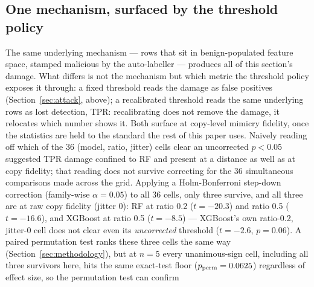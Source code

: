 \subsection{One mechanism, surfaced by the threshold policy}
The same underlying mechanism — rows that sit in benign-populated feature space, stamped
malicious by the auto-labeller — produces all of this section's damage. What differs is not the
mechanism but which metric the threshold policy exposes it through: a fixed threshold reads the
damage as false positives (Section~\ref{sec:attack}, above); a recalibrated threshold reads the
same underlying rows as lost detection, TPR: recalibrating does not remove the damage, it
relocates which number shows it. Both surface at copy-level mimicry fidelity, once the statistics
are held to the standard the rest of this paper uses.
Naively reading off which of the 36 (model, ratio, jitter) cells clear an uncorrected $p<0.05$
suggested TPR damage confined to RF and present at a distance as well as at copy fidelity; that
reading does not survive correcting for the 36 simultaneous comparisons made across the grid.
Applying a Holm-Bonferroni step-down correction (family-wise $\alpha=0.05$) to all 36 cells,
only three survive, and all three are at raw copy fidelity (jitter 0): RF at ratio 0.2
($t=-20.3$) and ratio 0.5 ($t=-16.6$), and XGBoost at ratio 0.5 ($t=-8.5$) — XGBoost's own
ratio-0.2, jitter-0 cell does not clear even its \emph{uncorrected} threshold ($t=-2.6$,
$p=0.06$). A paired permutation test ranks these three cells the same way (Section~\ref{sec:methodology}),
but at $n=5$ every unanimous-sign cell, including all three survivors here, hits the same exact-test
floor ($p_{\rm perm}=0.0625$) regardless of effect size, so the permutation test can confirm

